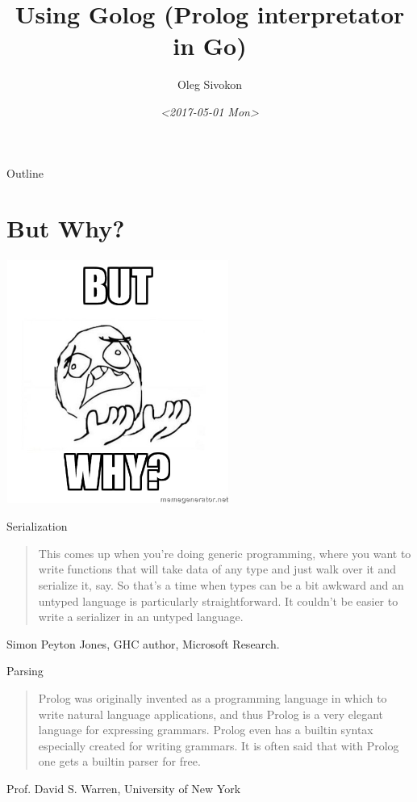 \documentclass[presentation]{beamer}
\author{Oleg Sivokon}
\date{\textit{<2017-05-01 Mon>}}
\title{Using Golog (Prolog interpretator in Go)}
\begin{document}
\maketitle
\begin{frame}{Outline}
\tableofcontents
\end{frame}


\section{But Why?}
\label{sec-1}
\includegraphics[height=8cm]{./images/butwhy.jpeg}

\begin{frame}[label=sec-1-1]{Serialization}
\begin{quote}
This comes up when you're doing generic programming, where you
want to write functions that will take data of any type and just
walk over it and serialize it, say.  So that's a time when types
can be a bit awkward and an untyped language is particularly
straightforward.  It couldn't be easier to write a serializer in
an untyped language.
\end{quote}
Simon Peyton Jones, GHC author, Microsoft Research.
\end{frame}

\begin{frame}[label=sec-1-2]{Parsing}
\begin{quote}
Prolog was originally invented as a programming language in which
to write natural language applications, and thus Prolog is a very
elegant language for expressing grammars.  Prolog even has a
builtin syntax especially created for writing grammars.  It is
often said that with Prolog one gets a builtin parser for free.
\end{quote}
Prof. David S. Warren, University of New York
\end{frame}
\end{document}
